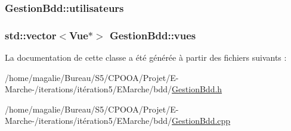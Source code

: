 \hypertarget{class_gestion_bdd_a43b0bcad5d1eb6ff51c78ceb6cdd972c}{
\subsubsection[{utilisateurs}]{ Gestion\-Bdd\-::utilisateurs\hspace{0.3cm}{\ttfamily [protected]}}}\label{class_gestion_bdd_a43b0bcad5d1eb6ff51c78ceb6cdd972c}
\hypertarget{class_gestion_bdd_a44ea1efd29c4996b1dcba0bf428051a7}{
\subsubsection[{vues}]{\setlength{\rightskip}{0pt plus 5cm}std\-::vector$<${\bf Vue}$\ast$$>$ Gestion\-Bdd\-::vues\hspace{0.3cm}{\ttfamily [protected]}}}\label{class_gestion_bdd_a44ea1efd29c4996b1dcba0bf428051a7}


La documentation de cette classe a été générée à partir des fichiers suivants \-:\begin{DoxyCompactItemize}
\item 
/home/magalie/\-Bureau/\-S5/\-C\-P\-O\-O\-A/\-Projet/\-E-\/\-Marche-\//iterations/itération5/\-E\-Marche/bdd/\hyperlink{_gestion_bdd_8h}{Gestion\-Bdd.\-h}\item 
/home/magalie/\-Bureau/\-S5/\-C\-P\-O\-O\-A/\-Projet/\-E-\/\-Marche-\//iterations/itération5/\-E\-Marche/bdd/\hyperlink{_gestion_bdd_8cpp}{Gestion\-Bdd.\-cpp}\end{DoxyCompactItemize}
